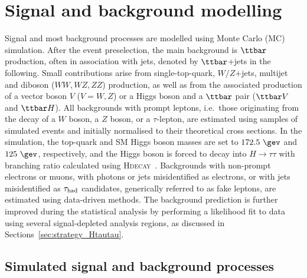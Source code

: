 \section{Signal and background modelling}
\label{sec:signal_background_model}

Signal and most background processes are modelled using Monte Carlo (MC) simulation.
After the event preselection, the main background is $\ttbar$ production, often in association with jets, denoted by $\ttbar$+jets in the following.
Small contributions arise from single-top-quark, $W/Z$+jets, multijet and diboson ($WW,WZ,ZZ$) production, as well as from the associated 
production of a vector boson $V$ ($V=W,Z$) or a Higgs boson and a $\ttbar$ pair ($\ttbar V$ and $\ttbar H$). All backgrounds 
with prompt leptons, i.e.\ those originating from the decay of a $W$ boson, a $Z$ boson, or a $\tau$-lepton,
are estimated using samples of simulated events and initially normalised to their theoretical cross sections.
In the simulation, the top-quark and SM Higgs boson masses are set to $172.5~\gev$ and $125~\gev$, respectively,
and the Higgs boson is forced to decay into $H\to \tau\tau$ with branching ratio calculated using \textsc{Hdecay}~\cite{Djouadi:1997yw}.  
Backgrounds with non-prompt electrons or muons, with photons or jets misidentified as electrons, or with jets misidentified as $\tau_{\mathrm{had}}$ candidates, 
generically referred to as fake leptons, are estimated using data-driven methods. 
The background prediction is further improved during the statistical analysis by performing a likelihood 
fit to data using several signal-depleted analysis regions, as discussed in Sections~\ref{sec:strategy_Htautau}.

\subsection{Simulated signal and background processes}
\label{sec:simulations}

